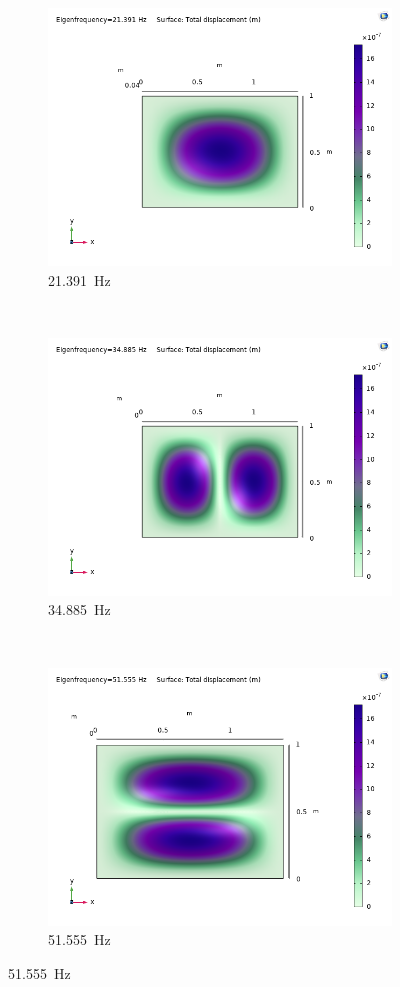 \documentclass[a4paper]{article}
\begin{document}
\begin{figure}[h]
	\centering
	\begin{subfigure}[b]{0.31\linewidth}
		\includegraphics[width=0.9\linewidth]{comsol/1c.png}
		\caption*{\SI{21.391}{\hertz}}
	\end{subfigure}
	~
	\begin{subfigure}[b]{0.31\linewidth}
		\includegraphics[width=0.9\linewidth]{comsol/2c.png}
		\caption*{\SI{34.885}{\hertz}}
	\end{subfigure}
	~
	\begin{subfigure}[b]{0.31\linewidth}
		\includegraphics[width=0.9\linewidth]{comsol/3c.png}
		\caption*{\SI{51.555}{\hertz}}
	\end{subfigure}
	

\end{figure}
\end{document}
